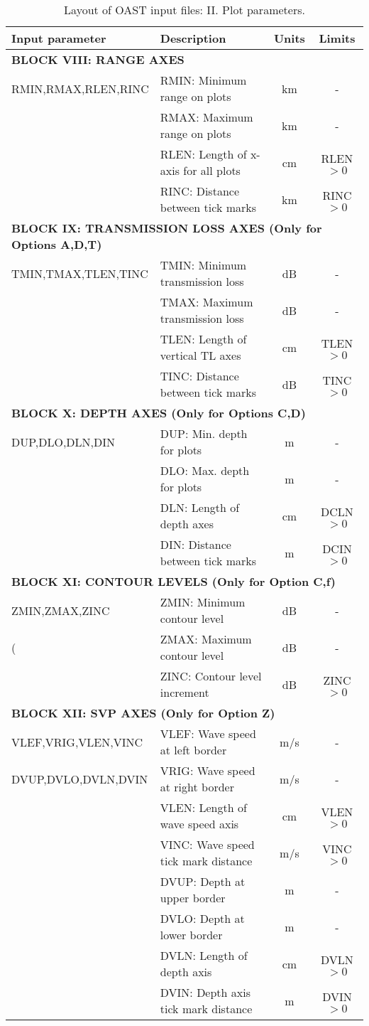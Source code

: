 \begin{table}
\begin{center}
\small
\begin{tabular}{|l|l|c|c|}
\hline \hline
Input parameter & Description & Units & Limits \\
\hline \hline
\multicolumn{4}{|l|}{\bf BLOCK VIII: RANGE AXES} \\
\hline
RMIN,RMAX,RLEN,RINC & RMIN: Minimum range on plots & km & - \\
	& RMAX: Maximum range on plots & km & - \\
	& RLEN: Length of x-axis for all plots & cm & RLEN$>0$ \\
	& RINC: Distance between tick marks & km & RINC$>0$ \\
\hline
\multicolumn{4}{|l|}{\bf BLOCK IX: TRANSMISSION LOSS AXES (Only for
Options A,D,T) } \\
\hline
TMIN,TMAX,TLEN,TINC & TMIN: Minimum transmission loss & dB & - \\
 & TMAX: Maximum transmission loss & dB & - \\
	& TLEN: Length of vertical TL axes & cm & TLEN$>0$ \\
	& TINC: Distance between tick marks & dB & TINC$>0$ \\
\hline
\multicolumn{4}{|l|}{\bf BLOCK X: DEPTH AXES (Only for Options C,D)} \\
\hline
DUP,DLO,DLN,DIN & DUP: Min. depth for plots & m & - \\
         & DLO: Max. depth for plots & m & - \\
	 & DLN: Length of depth axes & cm & DCLN$>0$ \\
	& DIN: Distance between tick marks & m & DCIN$>0$ \\
\hline
\multicolumn{4}{|l|}{\bf BLOCK XI: CONTOUR LEVELS (Only for Option C,f)} \\
\hline
ZMIN,ZMAX,ZINC & ZMIN: Minimum contour level & dB & - \\
(	& ZMAX: Maximum contour level & dB & - \\
	& ZINC: Contour level increment & dB & ZINC$>0$ \\
\hline
\multicolumn{4}{|l|}{\bf BLOCK XII: SVP AXES (Only for Option Z)} \\
\hline
VLEF,VRIG,VLEN,VINC & VLEF: Wave speed at left border & m/s & - \\
DVUP,DVLO,DVLN,DVIN & VRIG: Wave speed at right border & m/s & - \\
                & VLEN: Length of wave speed axis & cm & VLEN$>0$ \\
		& VINC: Wave speed tick mark distance & m/s & VINC$>0$ \\
		& DVUP: Depth at upper border  & m & - \\
		& DVLO: Depth at lower border  & m & - \\
		& DVLN: Length of depth axis   & cm & DVLN$>0$ \\
		& DVIN: Depth axis tick mark distance & m & DVIN$>0$ \\
\hline
\end{tabular}
\end{center}
\caption{Layout of OAST input files: II. Plot parameters.
	\label{tab:fipII} }
\end{table} 

